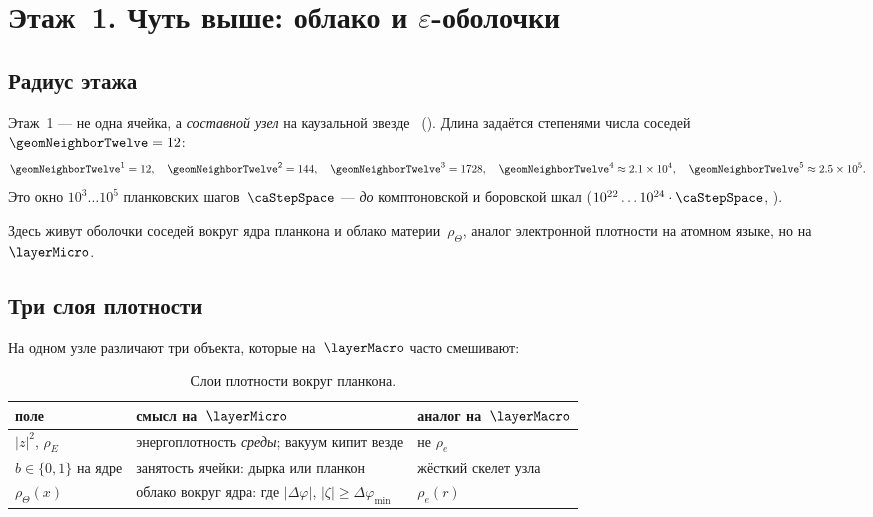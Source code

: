 \chapter{Этаж~1. Чуть выше: облако и \texorpdfstring{$\varepsilon$}{epsilon}-оболочки}
\label{ch:floor1}

\section{Радиус этажа}
\label{sec:floor1-scale}

Этаж~1 --- не одна ячейка, а \emph{составной узел} на каузальной звезде \latGCKshort\ ().
Длина задаётся степенями числа соседей $\geomNeighborTwelve=12$:
\[
  \geomNeighborTwelve^{1}=12,\quad
  \geomNeighborTwelve^{2}=144,\quad
  \geomNeighborTwelve^{3}=1728,\quad
  \geomNeighborTwelve^{4}\approx 2.1\times 10^{4},\quad
  \geomNeighborTwelve^{5}\approx 2.5\times 10^{5}.
\]
Это окно $10^{3}\ldots 10^{5}$ планковских шагов~$\caStepSpace$ ---
\emph{до} комптоновской и боровской шкал ($10^{22}\ldots 10^{24}\cdot\caStepSpace$,
).

Здесь живут оболочки соседей вокруг ядра планкона и облако материи~$\rho_\Theta$,
аналог электронной плотности на атомном языке, но на~$\layerMicro$.

\section{Три слоя плотности}
\label{sec:floor1-density-layers}

На одном узле различают три объекта, которые на~$\layerMacro$ часто смешивают:

\begin{table}[htbp]
  \centering
  \caption{Слои плотности вокруг планкона.}
  \label{tab:floor1-density}
  \begin{tabular}{@{}lll@{}}
    \toprule
    поле & смысл на~$\layerMicro$ & аналог на~$\layerMacro$ \\
    \midrule
    $|z|^2$, $\rho_E$ & энергоплотность \emph{среды}; вакуум кипит везде & не $\rho_e$ \\
    $b\in\{0,1\}$ на ядре & занятость ячейки: дырка или планкон & жёсткий скелет узла \\
    $\rho_\Theta(x)$ & облако вокруг ядра: где $|\Delta\varphi|$, $|\zeta|\geq\Delta\varphi_{\min}$ & $\rho_e(r)$ \\
    \bottomrule
  \end{tabular}
\end{table}

